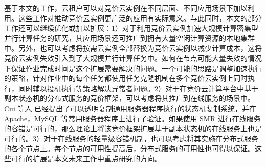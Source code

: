 基于本文的工作，云租户可以对竞价云实例在不同层面、不同应用场景下加以利用。这些工作对推动竞价云实例更广泛的应用有实际意义。与此同时，本文的部分工作还可以继续优化或加以扩展：1）对于利用竞价云实例加速大规模计算密集型并行计算任务的研究，其应用场景还可推广到拥有大量空闲计算资源的本地集群中。另外，也可以考虑将按需云实例全部替换为竞价云实例以减少计算成本，这将竞价云实例失效引入到了大规模并行计算任务中。如何在节点可能大量失效的情况下保证作业完成时间是这个扩展需要解决的问题。一个可能的思路是调整加速执行的策略，针对作业中的每个任务都使用任务克隆机制在多个竞价云实例上同时执行，同时辅以投机执行等策略解决异常者问题。2）对于在竞价云计算平台中基于副本状态机的分布式服务的竞价框架，可以考虑将其推广到在线服务的场景中。Cui 等人 \cite{Cui:2015:PAM:2815400.2815427} 已经提出了可以透明复制通用服务器程序执行的状态机复制系统，并在 Apache，MySQL 等常用服务器程序上进行了验证。如果使用 SMR 进行在线服务的容错是可行的，那么理论上将该竞价框架扩展基于副本状态机的在线服务上也是可行的。3）对于在线服务的轻量级容错机制，也可以考虑将其实施在分布式服务的各个节点上。每个节点的可用性提高后，分布式服务的可用性也可得以保证。这些可行的扩展是本文未来工作中重点研究的方向。